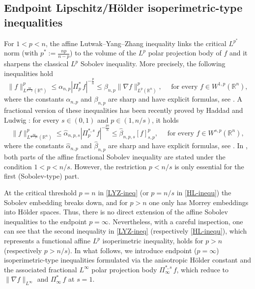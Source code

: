 \documentclass[11pt, reqno]{article}
\theoremstyle{definition}
\numberwithin{equation}{section}
\newcommand{\R}{\mathbb{R}}
\begin{document}
\subsection{Endpoint Lipschitz/Hölder isoperimetric-type inequalities}

For $1<p<n$, the affine Lutwak--Yang--Zhang inequality links the critical $L^{p^\ast}$ norm (with $p^\ast := \tfrac{np}{n-p}$) to the volume of the $L^p$ polar projection body of $f$ and it sharpens the classical $L^p$ Sobolev inequality.
More precisely, the following inequalities hold
\begin{equation}\label{LYZ-ineq}
    \| f \|^p_{L^\frac{np}{n - p}(\R^n)} \leq \alpha_{n, p} | \Pi^\ast_p \, f |^{-\frac{p}{n}} \leq \beta_{n, p} \| \nabla f \|_{L^p(\R^n)}^p, \quad \text{ for every } f \in W^{1, p}(\R^n),
\end{equation}
where the constants $\alpha_{n, p}$ and $\beta_{n, p}$ are sharp and have explicit formulas, see \cite{Aubin_1976, LYZ_2002, Talenti_1976}.
A fractional version of these inequalities has been recently proved by Haddad and Ludwig \cite{HL_2024}: for every $s \in (0, 1)$ and $p \in (1, n/s)$, it holds
\begin{equation}\label{HL-inequ}
    \| f \|^p_{L^{\frac{np}{n - ps}}(\R^n)} \leq \widehat\alpha_{n, p, s} | \Pi^{\ast, s}_p \, f|^{- \frac{ps}{n}} \leq \widehat\beta_{n, p, s} [f]^p_{s, p}, \quad \text{ for every } f \in W^{s, p}(\R^n),
\end{equation}
where the constants $\widehat\alpha_{n, p}$ and $\widehat\beta_{n, p}$ are sharp and have explicit formulas, see \cite{HL_2024, HL_2025}.
In \cite[Theorem~1]{HL_2024}, both parts of the affine fractional Sobolev inequality are stated under the condition $1 < p < n/s$. 
However, the restriction $p < n/s$ is only essential for the first (Sobolev-type) part.

\medskip

At the critical threshold $p=n$ in \eqref{LYZ-ineq} (or $p = n/s$ in \eqref{HL-inequ}) the Sobolev embedding breaks down, and for $p > n$ one only has Morrey embeddings into Hölder spaces.
Thus, there is no direct extension of the affine Sobolev inequalities to the endpoint $p=\infty$. 
Nevertheless, with a careful inspection, one can see that the second inequality in \eqref{LYZ-ineq} (respectively \eqref{HL-inequ}), which represents a functional affine $L^p$ isoperimetric inequality, holds for $p > n$ (respectively $p > n/s$).
In what follows, we introduce endpoint ($p=\infty$) isoperimetric-type inequalities formulated via the anisotropic H\"older constant and the associated fractional $L^\infty$ polar projection body $\Pi^{\ast,s}_{\infty} \, f$, which reduce to $\|\nabla f\|_{L^\infty}$ and $\Pi^{\ast}_{\infty} \, f$ at $s = 1$.
 
\end{document}
